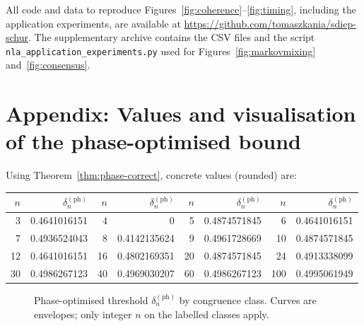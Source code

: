 \documentclass[12pt,fleqn]{amsart}
\theoremstyle{definition}
\theoremstyle{remark}
\newcommand{\1}{\mathbf{1}}
\begin{document}
All code and data to reproduce Figures~\ref{fig:coherence}--\ref{fig:timing}, including the application experiments, are available at \url{https://github.com/tomaszkania/sdiep-schur}.  The supplementary archive contains the CSV files and the script \texttt{nla\_application\_experiments.py} used for Figures~\ref{fig:markovmixing} and~\ref{fig:consensus}.

\appendix
\section*{Appendix: Values and visualisation of the phase-optimised bound}

Using Theorem~\ref{thm:phase-correct}, concrete values (rounded) are:

\begin{center}
\begin{tabular}{r r @{\qquad} r r @{\qquad} r r @{\qquad} r r}
\hline
$n$ & $\delta^{\mathrm{(ph)}}_n$ & $n$ & $\delta^{\mathrm{(ph)}}_n$ & $n$ & $\delta^{\mathrm{(ph)}}_n$ & $n$ & $\delta^{\mathrm{(ph)}}_n$ \\
\hline
3  & 0.4641016151 & 4  & 0                & 5  & 0.4874571845 & 6  & 0.4641016151 \\
7  & 0.4936524043 & 8  & 0.4142135624     & 9  & 0.4961728669 & 10 & 0.4874571845 \\
12 & 0.4641016151 & 16 & 0.4802169351     & 20 & 0.4874571845 & 24 & 0.4913338099 \\
30 & 0.4986267123 & 40 & 0.4969030207     & 60 & 0.4986267123 & 100 & 0.4995061949 \\
\hline
\end{tabular}
\end{center}

\begin{figure}[t]
\centering
{}
\caption{Phase-optimised threshold $\delta^{\mathrm{(ph)}}_n$ by congruence class. Curves are envelopes; only integer $n$ on the labelled classes apply.}
\end{figure}
\end{document}

